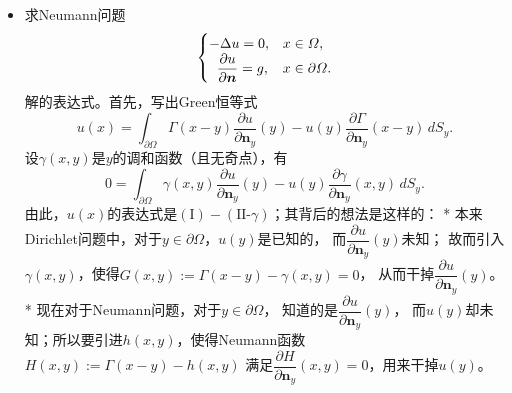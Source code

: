 \begin{itemize}
    由于\[\int_{\partial B_r(x)}\frac{\partial G_x}{\partial\boldsymbol{n}}
    =\int_{\partial B_r(y)}\frac{\partial G_y}{\partial\boldsymbol{n}}=-1,\]
    以及\[\int_{\partial B_r(x)}G_x\text{ 和 }\int_{\partial B_r(y)}G_y
    \sim|\partial B_r|\varGamma(r)
    \sim\begin{cases}Cr\ln\frac{1}{r}\rightarrow0,&\!\!n=2\\ \\
    Cr\rightarrow0,&\!\!n\geqslant3\end{cases}\quad\text{ 当 }r\rightarrow0,\]
    在$(*)$中让$r\rightarrow0$得到$G_y(x)=G_x(y)$，即$G(y,x)=G(x,y)$.

    \item[6.] 求Neumann问题
    $$\begin{cases}
        -\Delta u=0,&x\in\varOmega,\\
        \hspace{0.55em}\dfrac{\partial u}{\partial\boldsymbol{n}}=g,&x\in\partial\varOmega.
    \end{cases}$$
    解的表达式。首先，写出Green恒等式
    \[\tag{I}
        u(x)=\int_{\partial\varOmega}\varGamma(x-y)\frac{\partial u}{\partial\boldsymbol{n}_y}(y)
        -u(y)\frac{\partial\varGamma}{\partial\boldsymbol{n}_y}(x-y)\,dS_y.
    \]
    设$\gamma(x,y)$是$y$的调和函数（且无奇点），有
    \[\tag{II-$\gamma$}
        0=\int_{\partial\varOmega}\gamma(x,y)\frac{\partial u}{\partial\boldsymbol{n}_y}(y)
        -u(y)\frac{\partial\gamma}{\partial\boldsymbol{n}_y}(x,y)\,dS_y.
    \]
    由此，$u(x)$的表达式是$(\text{I})-(\text{II-}\gamma)$；其背后的想法是这样的：
    * 本来Dirichlet问题中，对于$y\in\partial\varOmega$，$u(y)$是已知的，
    而$\dfrac{\partial u}{\partial\boldsymbol{n}_y}(y)$未知；
    故而引入$\gamma(x,y)$，使得$G(x,y):=\varGamma(x-y)-\gamma(x,y)=0$，
    从而干掉$\dfrac{\partial u}{\partial\boldsymbol{n}_y}(y)$。
    * 现在对于Neumann问题，对于$y\in\partial\varOmega$，
    知道的是$\dfrac{\partial u}{\partial\boldsymbol{n}_y}(y)$，
    而$u(y)$却未知；所以要引进$h(x,y)$，使得Neumann函数$H(x,y):=\varGamma(x-y)-h(x,y)$
    满足$\dfrac{\partial H}{\partial\boldsymbol{n}_y}(x,y)=0$，用来干掉$u(y)$。


\end{itemize}
